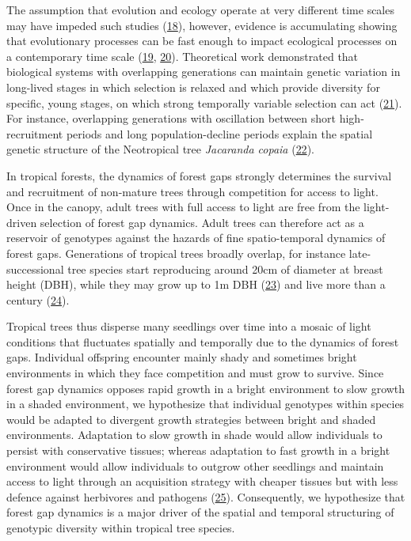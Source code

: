 \documentclass[
]{article}
\begin{document}
The assumption that evolution and ecology operate at very different time scales may have impeded such studies (\protect\hyperlink{ref-Pelletier2009}{18}),
however, evidence is accumulating showing that evolutionary processes can be fast enough to impact ecological processes on a contemporary time scale (\protect\hyperlink{ref-Hairston2005}{19}, \protect\hyperlink{ref-Rudman2017}{20}).
Theoretical work demonstrated that biological systems with overlapping generations can maintain genetic variation in long-lived stages in which selection is relaxed and which provide diversity for specific, young stages, on which strong temporally variable selection can act (\protect\hyperlink{ref-Ellner1994}{21}).
For instance, overlapping generations with oscillation between short high-recruitment periods and long population-decline periods explain the spatial genetic structure of the Neotropical tree \emph{Jacaranda copaia} (\protect\hyperlink{ref-Jones2006}{22}).

In tropical forests, the dynamics of forest gaps strongly determines the survival and recruitment of non-mature trees through competition for access to light.
Once in the canopy, adult trees with full access to light are free from the light-driven selection of forest gap dynamics.
Adult trees can therefore act as a reservoir of genotypes against the hazards of fine spatio-temporal dynamics of forest gaps.
Generations of tropical trees broadly overlap, for instance late-successional tree species start reproducing around 20cm of diameter at breast height (DBH),
while they may grow up to 1m DBH (\protect\hyperlink{ref-Hardy2006}{23}) and live more than a century (\protect\hyperlink{ref-OBrien1995}{24}).

Tropical trees thus disperse many seedlings over time into a mosaic of light conditions that fluctuates spatially and temporally due to the dynamics of forest gaps.
Individual offspring encounter mainly shady and sometimes bright environments in which they face competition and must grow to survive.
Since forest gap dynamics opposes rapid growth in a bright environment to slow growth in a shaded environment,
we hypothesize that individual genotypes within species would be adapted to divergent growth strategies between bright and shaded environments.
Adaptation to slow growth in shade would allow individuals to persist with conservative tissues;
whereas adaptation to fast growth in a bright environment would allow individuals to outgrow other seedlings and maintain access to light through an acquisition strategy with cheaper tissues but with less defence against herbivores and pathogens (\protect\hyperlink{ref-Fine2006}{25}).
Consequently, we hypothesize that forest gap dynamics is a major driver of the spatial and temporal structuring of genotypic diversity within tropical tree species.
\end{document}
